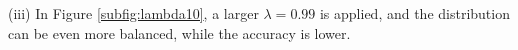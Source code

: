 (iii) In Figure \ref{subfig:lambda10}, a larger $\lambda=0.99$ is applied, and the distribution can be even more balanced, while the accuracy is lower.








